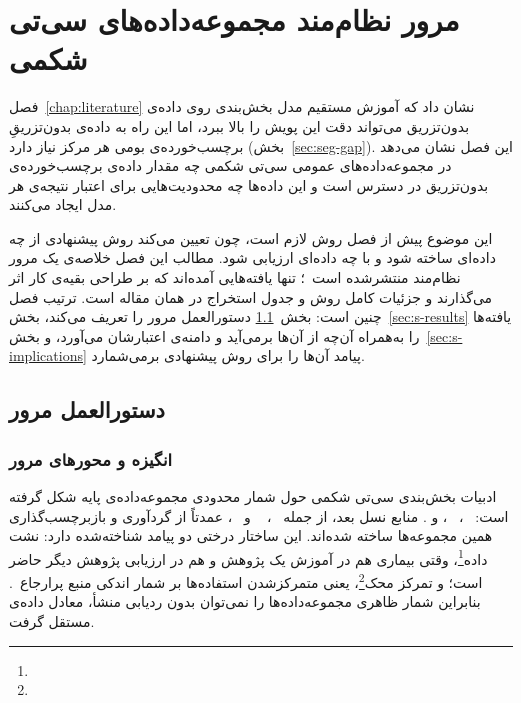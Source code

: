 
\chapter{مرور نظام‌مند مجموعه‌داده‌های سی‌تی شکمی}
\label{chap:survey}

فصل~\ref{chap:literature} نشان داد که آموزش مستقیم مدل بخش‌بندی روی داده‌ی بدون‌تزریق می‌تواند دقت این پویش را بالا ببرد، اما این راه به داده‌ی بدون‌تزریقِ برچسب‌خورده‌ی بومی هر مرکز نیاز دارد (بخش~\ref{sec:seg-gap}). این فصل نشان می‌دهد در مجموعه‌داده‌های عمومی سی‌تی شکمی چه مقدار داده‌ی برچسب‌خورده‌ی بدون‌تزریق در دسترس است و این داده‌ها چه محدودیت‌هایی برای اعتبار نتیجه‌ی هر مدل ایجاد می‌کنند.

این موضوع پیش از فصل روش لازم است، چون تعیین می‌کند روش پیشنهادی از چه داده‌ای ساخته شود و با چه داده‌ای ارزیابی شود. مطالب این فصل خلاصه‌ی یک مرور نظام‌مند منتشرشده است~\cite{danaei2026abdomenctreview}؛ تنها یافته‌هایی آمده‌اند که بر طراحی بقیه‌ی کار اثر می‌گذارند و جزئیات کامل روش و جدول استخراج در همان مقاله است. ترتیب فصل چنین است: بخش~\ref{sec:s-protocol} دستورالعمل مرور را تعریف می‌کند، بخش~\ref{sec:s-results} یافته‌ها را به‌همراه آن‌چه از آن‌ها برمی‌آید و دامنه‌ی اعتبارشان می‌آورد، و بخش~\ref{sec:s-implications} پیامد آن‌ها را برای روش پیشنهادی برمی‌شمارد.

\section{دستورالعمل مرور}
\label{sec:s-protocol}

\subsection{انگیزه و محورهای مرور}
\label{sec:datasets}

ادبیات بخش‌بندی سی‌تی شکمی حول شمار محدودی مجموعه‌داده‌ی پایه شکل گرفته است: ~\cite{Lits2017}، ~\cite{kits2019}،  و . منابع نسل بعد، از جمله ~\cite{abdomenct2021}، ~\cite{flare23} و ~\cite{abdomenatlas2024}، عمدتاً از گردآوری و بازبرچسب‌گذاری همین مجموعه‌ها ساخته شده‌اند. این ساختار درختی دو پیامد شناخته‌شده دارد: نشت داده\footnote{}، وقتی بیماری هم در آموزش یک پژوهش و هم در ارزیابی پژوهش دیگر حاضر است؛ و تمرکز محک\footnote{}، یعنی متمرکزشدن استفاده‌ها بر شمار اندکی منبع پرارجاع~\cite{koch2021reduced,varoquaux2022machine}. بنابراین شمار ظاهری مجموعه‌داده‌ها را نمی‌توان بدون ردیابی منشأ، معادل داده‌ی مستقل گرفت.

